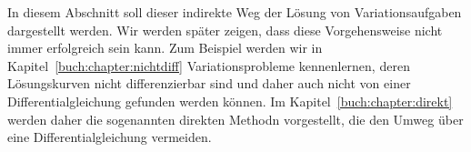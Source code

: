 In diesem Abschnitt soll dieser indirekte Weg der Lösung von
Variationsaufgaben dargestellt werden.
Wir werden später zeigen, dass diese Vorgehensweise nicht immer
erfolgreich sein kann.
Zum Beispiel werden wir in Kapitel~\ref{buch:chapter:nichtdiff}
Variationsprobleme kennenlernen, deren Lösungskurven nicht
differenzierbar sind und daher auch nicht von einer Differentialgleichung
gefunden werden können.
Im Kapitel~\ref{buch:chapter:direkt} werden daher die sogenannten
direkten Methodn vorgestellt, die den Umweg über eine
Differentialgleichung vermeiden.






%
%
